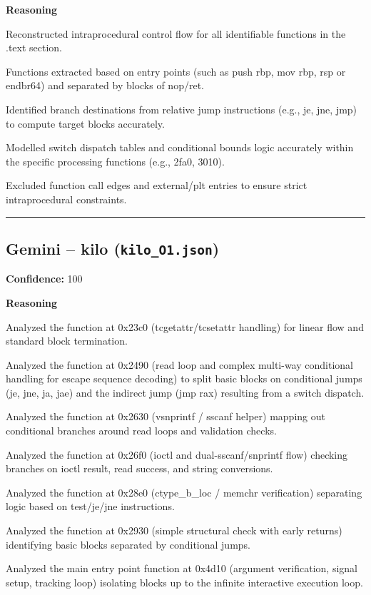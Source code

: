 \textbf{Reasoning}

Reconstructed intraprocedural control flow for all identifiable functions in the .text section.

Functions extracted based on entry points (such as push rbp, mov rbp, rsp or endbr64) and separated by blocks of nop/ret.

Identified branch destinations from relative jump instructions (e.g., je, jne, jmp) to compute target blocks accurately.

Modelled switch dispatch tables and conditional bounds logic accurately within the specific processing functions (e.g., 2fa0, 3010).

Excluded function call edges and external/plt entries to ensure strict intraprocedural constraints.

\bigskip
\hrule
\bigskip

\subsection{Gemini -- kilo (\texttt{kilo\_O1.json})}

\textbf{Confidence:} 100

\textbf{Reasoning}

Analyzed the function at 0x23c0 (tcgetattr/tcsetattr handling) for linear flow and standard block termination.

Analyzed the function at 0x2490 (read loop and complex multi-way conditional handling for escape sequence decoding) to split basic blocks on conditional jumps (je, jne, ja, jae) and the indirect jump (jmp rax) resulting from a switch dispatch.

Analyzed the function at 0x2630 (vsnprintf / sscanf helper) mapping out conditional branches around read loops and validation checks.

Analyzed the function at 0x26f0 (ioctl and dual-sscanf/snprintf flow) checking branches on ioctl result, read success, and string conversions.

Analyzed the function at 0x28e0 (ctype\_b\_loc / memchr verification) separating logic based on test/je/jne instructions.

Analyzed the function at 0x2930 (simple structural check with early returns) identifying basic blocks separated by conditional jumps.

Analyzed the main entry point function at 0x4d10 (argument verification, signal setup, tracking loop) isolating blocks up to the infinite interactive execution loop.

